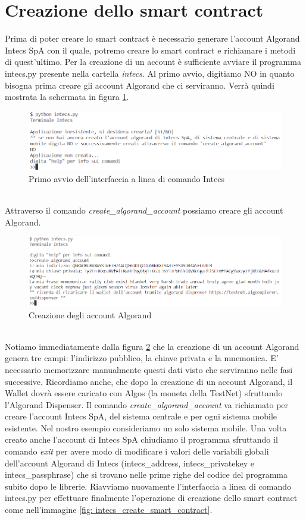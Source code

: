 \section{Creazione dello smart contract}\label{creazionesmartcontract}
Prima di poter creare lo smart contract è necessario generare l'account Algorand Intecs SpA con il quale, potremo creare lo smart contract e richiamare i metodi di quest'ultimo. Per la creazione di un account è sufficiente avviare il programma intecs.py presente nella cartella \textit{intecs}. Al primo avvio, digitiamo NO in quanto bisogna prima creare gli account Algorand che ci serviranno. Verrà quindi mostrata la schermata in figura \ref{fig: intecs_primoavvio }.
\begin{figure}[!h]
\flushleft
\includegraphics[scale=0.8]{images/Intecs/primo_avvio.png}
\caption{Primo avvio dell'interfaccia a linea di comando Intecs}
\label{fig: intecs_primoavvio }
\end{figure}\\
Attraverso il comando \textit{create\_algorand\_account} possiamo creare gli account Algorand.
\begin{figure}[!h]
\centering
\includegraphics[scale=0.8]{images/Intecs/create_algorand_account_2.png}
\caption{Creazione degli account Algorand}
\label{fig: cli_creazioneaccount2 }
\end{figure}\\
Notiamo immediatamente dalla figura \ref{fig: cli_creazioneaccount2 } che la creazione di un account Algorand genera tre campi: l'indirizzo pubblico, la chiave privata e la mnemonica. E' necessario memorizzare manualmente questi dati visto che serviranno nelle fasi successive. Ricordiamo anche, che dopo la creazione di un account Algorand, il Wallet dovrà essere caricato con Algos (la moneta della TestNet) sfruttando l'Algorand Dispenser. Il comando \textit{create\_algorand\_account} va richiamato per creare l'account Intecs SpA, del sistema centrale e per ogni sistema mobile esistente. Nel nostro esempio consideriamo un solo sistema mobile. Una volta creato anche l'account di Intecs SpA chiudiamo il programma sfruttando il comando \textit{exit} per avere modo di modificare i valori delle variabili globali dell'account Algorand di Intecs (intecs\_address, intecs\_privatekey e intecs\_passphrase) che si trovano nelle prime righe del codice del programma subito dopo le librerie. Riavviamo nuovamente l'interfaccia a linea di comando intecs.py per effettuare finalmente l'operazione di creazione dello smart contract come nell'immagine \ref{fig: intecs_create_smart_contract}. 
